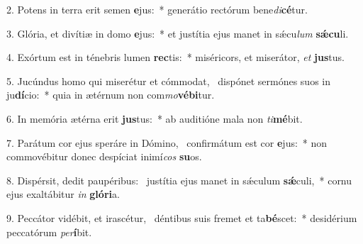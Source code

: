 2. Potens in terra erit semen \textbf{e}jus:~*  generátio rectórum bene\textit{di}\textbf{cé}tur.\

3. Glória, et divítiæ in domo \textbf{e}jus:~*  et justítia ejus manet in sǽcu\textit{lum} \textbf{sǽ}\textbf{cu}li.\

4. Exórtum est in ténebris lumen \textbf{rec}tis:~*  miséricors, et miserátor, \textit{et} \textbf{jus}tus.\

5. Jucúndus homo qui miserétur et cómmodat, \dag\  dispónet sermónes suos in ju\textbf{dí}cio:~*  quia in ætérnum non com\textit{mo}\textbf{vé}\textbf{bi}tur.\

6. In memória ætérna erit \textbf{jus}tus:~*  ab auditióne mala non \textit{ti}\textbf{mé}bit.\

7. Parátum cor ejus speráre in Dómino, \dag\  confirmátum est cor \textbf{e}jus:~*  non commovébitur donec despíciat inimí\textit{cos} \textbf{su}os.\

8. Dispérsit, dedit paupéribus: \dag\  justítia ejus manet in sǽculum \textbf{sǽ}culi,~*  cornu ejus exaltábitur \textit{in} \textbf{gló}\textbf{ri}a.\

9. Peccátor vidébit, et irascétur, \dag\  déntibus suis fremet et ta\textbf{bé}scet:~*  desidérium peccatórum \textit{per}\textbf{í}bit.\


